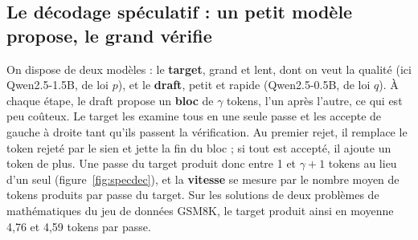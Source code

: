\documentclass[11pt,a4paper]{article}
\theoremstyle{plain}
\theoremstyle{definition}
\begin{document}
\subsection{Le décodage spéculatif : un petit modèle propose, le grand vérifie}\label{sec:specdec}
On dispose de deux modèles : le \textbf{target}, grand et lent, dont on veut la qualité (ici Qwen2.5-1.5B, de loi $p$), et le \textbf{draft}, petit et rapide (Qwen2.5-0.5B, de loi $q$).
À chaque étape, le draft propose un \textbf{bloc} de $\gamma$ tokens, l'un après l'autre, ce qui est peu coûteux.
Le target les examine tous en une seule passe et les accepte de gauche à droite tant qu'ils passent la vérification.
Au premier rejet, il remplace le token rejeté par le sien et jette la fin du bloc ; si tout est accepté, il ajoute un token de plus.
Une passe du target produit donc entre 1 et $\gamma+1$ tokens au lieu d'un seul (figure~\ref{fig:specdec}), et la \textbf{vitesse} se mesure par le nombre moyen de tokens produits par passe du target.
Sur les solutions de deux problèmes de mathématiques du jeu de données GSM8K, le target produit ainsi en moyenne 4,76 et 4,59 tokens par passe.
\end{document}
